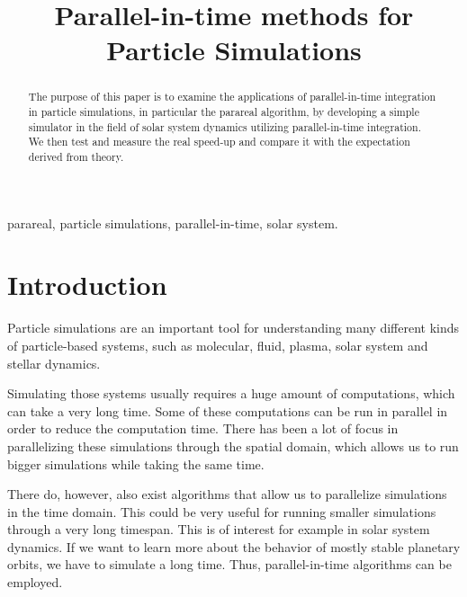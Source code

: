 \documentclass[conference]{IEEEtran}
\begin{document}
\title{Parallel-in-time methods for Particle Simulations}

\author{
}

\maketitle

\begin{abstract}
The purpose of this paper is to examine the applications of parallel-in-time integration in particle simulations, in particular the parareal algorithm, by developing a simple simulator in the field of solar system dynamics utilizing parallel-in-time integration. We then test and measure the real speed-up and compare it with the expectation derived from theory.
\end{abstract}

\begin{IEEEkeywords}
parareal, particle simulations, parallel-in-time, solar system.
\end{IEEEkeywords}

\section{Introduction}

Particle simulations are an important tool for understanding many different kinds of particle-based systems, such as molecular, fluid, plasma, solar system and stellar dynamics.

Simulating those systems usually requires a huge amount of computations, which can take a very long time. Some of these computations can be run in parallel in order to reduce the computation time. There has been a lot of focus in parallelizing these simulations through the spatial domain, which allows us to run bigger simulations while taking the same time.

There do, however, also exist algorithms that allow us to parallelize simulations in the time domain. This could be very useful for running smaller simulations through a very long timespan. This is of interest for example in solar system dynamics. If we want to learn more about the behavior of mostly stable planetary orbits, we have to simulate a long time. Thus, parallel-in-time algorithms can be employed.\cite{parallelsolar}
\end{document}
